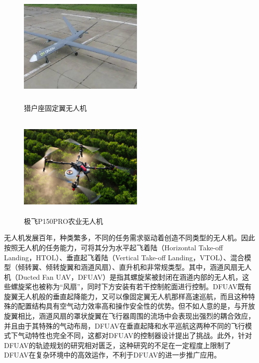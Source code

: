 \begin{figure}[htbp]
	\centering
	\begin{minipage}[c]{0.5\textwidth} %
		\centering
		\includegraphics[width=6cm,height=5cm]{Fig/Orion.jpg}
		\caption{\label{Orion}猎户座固定翼无人机}
	\end{minipage}%
	\begin{minipage}[c]{0.5\textwidth}
		\centering
		\includegraphics[width=6cm,height=5cm]{Fig/P150PRO.png}
		\caption{\label{P150PRO}极飞P150PRO农业无人机}
	\end{minipage}
\end{figure}

无人机发展百年，种类繁多，不同的任务需求驱动着创造不同类型的无人机。因此按照无人机的任务能力，可将其分为水平起飞着陆（Horizontal Take-off Landing，HTOL）、垂直起飞着陆（Vertical Take-off Landing，VTOL）、混合模型（倾转翼、倾转旋翼和涵道风扇）、直升机和非常规类型\cite{hassanalianClassificationsApplicationsDesign2017}。其中，涵道风扇无人机（Ducted Fan UAV，DFUAV）是指其螺旋桨被封闭在涵道内部的无人机，这些螺旋桨也被称为“风扇”，同时下方安装有若干控制舵面进行控制。DFUAV既有旋翼无人机般的垂直起降能力，又可以像固定翼无人机那样高速巡航，而且这种特殊的配置结构具有空气动力效率高和操作安全性的优势\cite{johnsonModelingControlFlight2006b,zhangReviewDuctedFans2020b,qianImprovingPerformanceDucted2022}。但不如人意的是，与开放旋翼相比，涵道风扇的罩状旋翼在飞行器周围的流场中会表现出强烈的耦合效应\cite{iiiNondimensionalModelingDuctedFan2012}，并且由于其特殊的气动布局，DFUAV在垂直起降和水平巡航这两种不同的飞行模式下气动特性也完全不同\cite{johnsonModelingControlFlight2006b}，这都对DFUAV的控制器设计提出了挑战。此外，针对DFUAV的轨迹规划的研究相对匮乏，这种研究的不足在一定程度上限制了DFUAV在复杂环境中的高效运作，不利于DFUAV的进一步推广应用。


